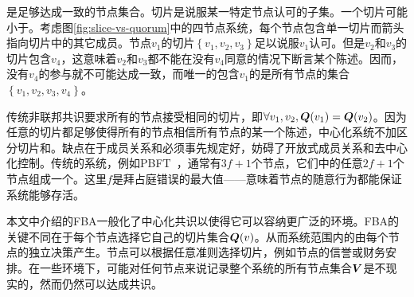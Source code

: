 {\quorum}是足够达成一致的节点集合。切片是说服某一特定节点认可的{\quorum}子集。一个{\quorum}切片可能小于{\quorum}。考虑图\ref{fig:slice-vs-quorum}中的四节点系统，每个节点包含单一切片而箭头指向切片中的其它成员。节点$v_1$的切片$\left\{v_1,v_2,v_3\right\}$足以说服$v_1$认可。但是$v_2$和$v_3$的切片包含$v_4$，这意味着$v_2$和$v_3$都不能在没有$v_4$同意的情况下断言某个陈述。因而，没有$v_4$的参与就不可能达成一致，而唯一的包含$v_1$的{\quorum}是所有节点的集合$\left\{v_1,v_2,v_3,v_4\right\}$。

传统非联邦共识要求所有的节点接受相同的切片，即$\forall v_1, v_2, {\bm Q}(v_1)={\bm Q}(v_2)$。因为任意的切片都足够使得所有的节点相信所有节点的某一个陈述，中心化系统不加区分切片和{\quorum}。缺点在于成员关系和{\quorum}必须事先规定好，妨碍了开放式成员关系和去中心化控制。传统的系统，例如PBFT~，通常有$3f+1$个节点，它们中的任意$2f+1$个节点组成一个{\quorum}。这里$f$是拜占庭错误的最大值——意味着节点的随意行为都能保证系统能够存活。

本文中介绍的FBA一般化了中心化共识以使得它可以容纳更广泛的环境。FBA的关键不同在于每个节点选择它自己的{\quorum}切片集合${\bm Q}(v)$。从而系统范围内的{\quorum}由每个节点的独立决策产生。节点可以根据任意准则选择切片，例如节点的信誉或财务安排。在一些环境下，可能对任何节点来说记录整个系统的所有节点集合${{\bm V}}$是不现实的，然而仍然可以达成共识。